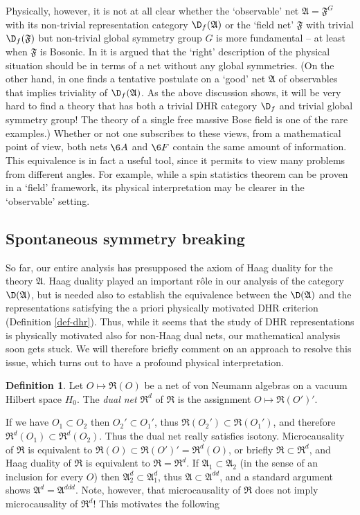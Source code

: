 \documentclass[11pt]{article}
\newcommand{\alg}[1]{\mathfrak{#1}}
\theoremstyle{definition}
\theoremstyle{definition}
\newtheorem{defn}[thm]{Definition}
\theoremstyle{remark}
\begin{document}
Physically, however, it is not at all clear whether the
`observable' net $\alg{A}=\alg{F}^G$ with its
non-trivial representation category $\D_f(\alg{A})$ or
the `field net' $\alg{F}$ with trivial $\D_f(\alg{F})$
but non-trivial global symmetry group $G$ is more
fundamental -- at least when $\alg{F}$ is Bosonic. In
\cite{haag} it is argued that the `right' description
of the physical situation should be in terms of a net
without any global symmetries. (On the other hand, in
\cite[Section III.4.2]{haag} one finds a tentative
postulate on a `good' net $\alg{A}$ of observables that
implies triviality of $\D_f(\alg{A})$. As the above
discussion shows, it will be very hard to find a theory
that has both a trivial DHR category $\D_f$ and trivial
global symmetry group! The theory of a single free
massive Bose field is one of the rare examples.)
Whether or not one subscribes to these views, from a
mathematical point of view, both nets $\6A$ and $\6F$
contain the same amount of information. This
equivalence is in fact a useful tool, since it permits
to view many problems from different angles. For
example, while a spin statistics theorem can be proven
in a `field' framework, its physical interpretation may
be clearer in the `observable' setting.


\subsection{Spontaneous symmetry breaking} \label{ssb}

So far, our entire analysis has presupposed the axiom of Haag duality for the theory
$\alg{A}$. Haag duality played an important r\^ole in our analysis of the category
$\D(\alg{A})$, but is needed also to establish the equivalence between the
$\D(\alg{A})$ and the representations satisfying the a priori physically motivated
DHR criterion (Definition \ref{def-dhr}). Thus, while it seems that the study of DHR
representations is physically motivated also for non-Haag dual nets, our mathematical
analysis soon gets stuck. We will therefore briefly comment on an approach to resolve
this issue, which turns out to have a profound physical interpretation.

\begin{defn} Let $O\mapsto\alg{R}(O)$ be a net of von Neumann algebras on a vacuum Hilbert space $H_0$.
The \emph{dual net} $\alg{R}^d$ of $\alg{R}$ is the assignment $O\mapsto \alg{R}(O')'$.
\end{defn}

If we have $O_1\subset O_2$ then $O_2'\subset O_1'$, thus
$\alg{R}(O_2')\subset\alg{R}(O_1')$, and therefore
$\alg{R}^d(O_1)\subset\alg{R}^d(O_2)$. Thus the dual net really satisfies isotony.
Microcausality of $\alg{R}$ is equivalent to
$\alg{R}(O)\subset\alg{R}(O')'=\alg{R}^d(O)$, or briefly $\alg{R}\subset\alg{R}^d$,
and Haag duality of $\alg{R}$ is equivalent to $\alg{R}=\alg{R}^d$. If
$\alg{A}_1\subset\alg{A}_2$ (in the sense of an inclusion for every $O$) then
$\alg{A}^d_2\subset\alg{A}^d_1$, thus $\alg{A}\subset\alg{A}^{dd}$, and a standard
argument shows $\alg{A}^{d}=\alg{A}^{ddd}$. Note, however, that microcausality of
$\alg{R}$ does not imply microcausality of $\alg{R}^d$! This motivates the following
\end{document}
